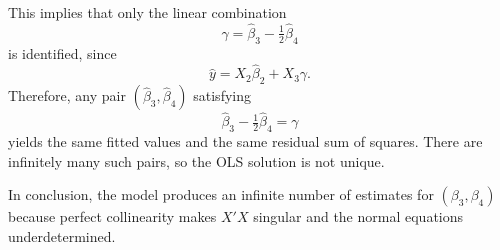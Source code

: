 \begin{enumerate}[label=(\roman*)]
This implies that only the linear combination
\[
\gamma = \hat{\beta}_3 - \tfrac{1}{2}\hat{\beta}_4
\]
is identified, since
\[
\hat{y} = X_2\hat{\beta}_2 + X_3\gamma.
\]
Therefore, any pair $(\hat{\beta}_3, \hat{\beta}_4)$ satisfying
\[
\hat{\beta}_3 - \tfrac{1}{2}\hat{\beta}_4 = \gamma
\]
yields the same fitted values and the same residual sum of squares. 
There are infinitely many such pairs, so the OLS solution is not unique.

In conclusion, the model produces an infinite number of estimates for $(\beta_3,\beta_4)$ 
because perfect collinearity makes $X'X$ singular and the normal equations underdetermined.

\end{enumerate}


